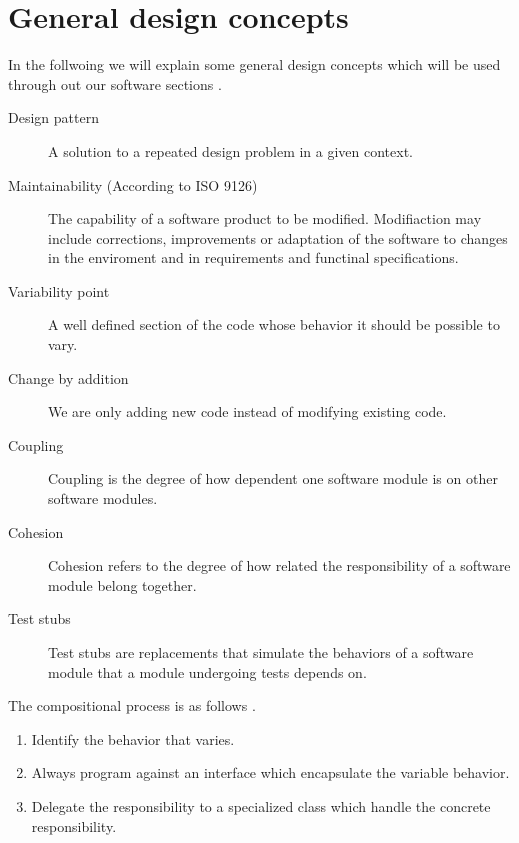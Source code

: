 \section{General design concepts}
In the follwoing we will explain some general design concepts which will be used through out our software sections \cite{Baerbak10}. 

\begin{description}
    \item[Design pattern] A solution to a repeated design problem in a given context.  
     \item[Maintainability (According to ISO 9126) ] The capability of a software product to be modified. Modifiaction may include corrections, improvements or adaptation of the software to changes in the enviroment and in requirements and functinal specifications.   
    \item[Variability point] A well defined section of the code whose behavior it should be possible to vary.  
    \item[Change by addition] We are only adding new code instead of modifying existing code. 
    \item[Coupling] Coupling is the degree of how dependent one software module is on other software modules. 
    \item[Cohesion] Cohesion refers to the degree of how related the responsibility of a software module belong together.    
   \item[Test stubs] Test stubs are replacements that simulate the behaviors of a software module that a module undergoing tests depends on.
\end{description}


\noindent
The compositional process is as follows \cite{Baerbak10}.

\begin{enumerate}
    \item Identify the behavior that varies. 

    \item Always program against an interface which encapsulate the variable behavior.
    
    \item Delegate the responsibility to a specialized class which handle the concrete responsibility.
\end{enumerate}